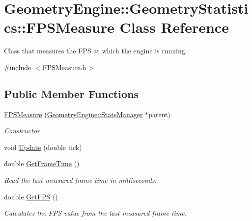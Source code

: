\hypertarget{class_geometry_engine_1_1_geometry_statistics_1_1_f_p_s_measure}{}\section{Geometry\+Engine\+::Geometry\+Statistics\+::F\+P\+S\+Measure Class Reference}
\label{class_geometry_engine_1_1_geometry_statistics_1_1_f_p_s_measure}


Class that measures the F\+PS at which the engine is running.  




{\ttfamily \#include $<$F\+P\+S\+Measure.\+h$>$}

\subsection*{Public Member Functions}
\begin{DoxyCompactItemize}
\item 
\mbox{\label{class_geometry_engine_1_1_geometry_statistics_1_1_f_p_s_measure_ab64a1b8dda77ae59c26500a206e537c8}} 
\mbox{\hyperlink{class_geometry_engine_1_1_geometry_statistics_1_1_f_p_s_measure_ab64a1b8dda77ae59c26500a206e537c8}{F\+P\+S\+Measure}} (\mbox{\hyperlink{class_geometry_engine_1_1_stats_manager}{Geometry\+Engine\+::\+Stats\+Manager}} $\ast$parent)
\begin{DoxyCompactList}\small\item\em Constructor. \end{DoxyCompactList}\item 
void \mbox{\hyperlink{class_geometry_engine_1_1_geometry_statistics_1_1_f_p_s_measure_af6a9254c6b4b0fdf327b716d490a8d67}{Update}} (double tick)
\item 
\mbox{\label{class_geometry_engine_1_1_geometry_statistics_1_1_f_p_s_measure_ac645a9506a11f939a81009adbf86d9ec}} 
double \mbox{\hyperlink{class_geometry_engine_1_1_geometry_statistics_1_1_f_p_s_measure_ac645a9506a11f939a81009adbf86d9ec}{Get\+Frame\+Time}} ()
\begin{DoxyCompactList}\small\item\em Read the last measured frame time in milliseconds. \end{DoxyCompactList}\item 
\mbox{\label{class_geometry_engine_1_1_geometry_statistics_1_1_f_p_s_measure_a9d94c3f7eac40f099794933e2785e440}} 
double \mbox{\hyperlink{class_geometry_engine_1_1_geometry_statistics_1_1_f_p_s_measure_a9d94c3f7eac40f099794933e2785e440}{Get\+F\+PS}} ()
\begin{DoxyCompactList}\small\item\em Calculates the F\+PS value from the last measured frame time. \end{DoxyCompactList}\end{DoxyCompactItemize}
